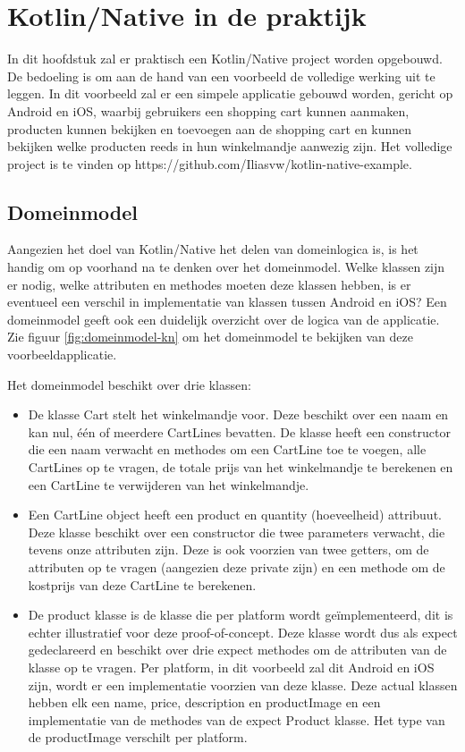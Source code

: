 \chapter{Kotlin/Native in de praktijk}
\label{ch:praktisch}
In dit hoofdstuk zal er praktisch een Kotlin/Native project worden opgebouwd. De bedoeling is om aan de hand van een voorbeeld de volledige werking uit te leggen. In dit voorbeeld zal er een simpele applicatie gebouwd worden, gericht op Android en iOS, waarbij gebruikers een shopping cart kunnen aanmaken, producten kunnen bekijken en toevoegen aan de shopping cart en kunnen bekijken welke producten reeds in hun winkelmandje aanwezig zijn. Het volledige project is te vinden op https://github.com/Iliasvw/kotlin-native-example.

\section{Domeinmodel}
\label{sec:domeinmodel}
Aangezien het doel van Kotlin/Native het delen van domeinlogica is, is het handig om op voorhand na te denken over het domeinmodel. Welke klassen zijn er nodig, welke attributen en methodes moeten deze klassen hebben, is er eventueel een verschil in implementatie van klassen tussen Android en iOS? Een domeinmodel geeft ook een duidelijk overzicht over de logica van de applicatie. Zie figuur \ref{fig:domeinmodel-kn} om het domeinmodel te bekijken van deze voorbeeldapplicatie. 

Het domeinmodel beschikt over drie klassen: 
\begin{itemize}
	\item De klasse Cart stelt het winkelmandje voor. Deze beschikt over een naam en kan nul, één of meerdere CartLines bevatten. De klasse heeft een constructor die een naam verwacht en methodes om een CartLine toe te voegen, alle CartLines op te vragen, de totale prijs van het winkelmandje te berekenen en een CartLine te verwijderen van het winkelmandje.
	
	\item Een CartLine object heeft een product en quantity (hoeveelheid) attribuut. Deze klasse beschikt over een constructor die twee parameters verwacht, die tevens onze attributen zijn. Deze is ook voorzien van twee getters, om de attributen op te vragen (aangezien deze private zijn) en een methode om de kostprijs van deze CartLine te berekenen.
	
	\item De product klasse is de klasse die per platform wordt geïmplementeerd, dit is echter illustratief voor deze proof-of-concept. Deze klasse wordt dus als expect gedeclareerd en beschikt over drie expect methodes om de attributen van de klasse op te vragen. Per platform, in dit voorbeeld zal dit Android en iOS zijn, wordt er een implementatie voorzien van deze klasse. Deze actual klassen hebben elk een name, price, description en productImage en een implementatie van de methodes van de expect Product klasse. Het type van de productImage verschilt per platform.
\end{itemize}

